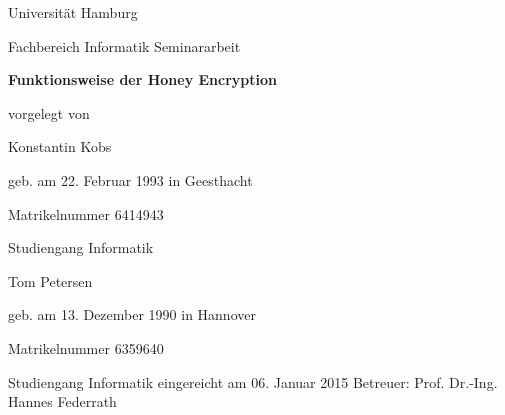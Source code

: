 \documentclass[12pt]{scrartcl}
\begin{document}
\newpage

\thispagestyle{empty}
\begin{center}\Large
Universität Hamburg \par
Fachbereich Informatik
\vfill
Seminararbeit
\vfill
{\Large\textsf{\textbf{Funktionsweise der Honey Encryption}}\par}
\vfill
vorgelegt von 
\par\bigskip
Konstantin Kobs \par
geb. am 22. Februar 1993 in Geesthacht \par
Matrikelnummer 6414943 \par
Studiengang Informatik
\par\bigskip
Tom Petersen \par
geb. am 13. Dezember 1990 in Hannover \par
Matrikelnummer 6359640 \par
Studiengang Informatik
\vfill
eingereicht am 06. Januar 2015
\vfill 
Betreuer: Prof. Dr.-Ing. Hannes Federrath \par
\end{center}

\newpage

\tableofcontents
\newpage


\newpage


\newpage


\newpage


\newpage


\newpage


\newpage

\nocite{*}

\begingroup
\let\itshape\upshape


\endgroup
\end{document}
